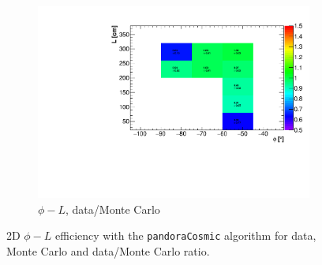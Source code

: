 \documentclass[a4paper]{scrartcl}
\begin{document}
\begin{figure}[htbp]
\begin{center}
\begin{subfigure}{0.52\textwidth}
\includegraphics[width=\linewidth]{figures/ratio_phi_l.pdf}
\caption{$\phi - L$, data/Monte Carlo}\label{fig:2d_cry_ratio_3}
\end{subfigure}
\caption{2D $\phi - L$ efficiency with the \texttt{pandoraCosmic} algorithm for data, Monte Carlo and data/Monte Carlo ratio.} \label{fig:cry_mc_2d_3}
\end{center}
\end{figure}
\end{document}
